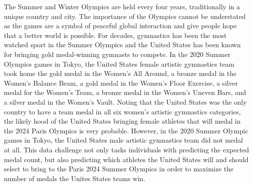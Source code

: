 \documentclass[12pt]{article}
\begin{document}
The Summer and Winter Olympics are held every four years, traditionally in a unique country and city.
The importance of the Olympics cannot be understated as the games are a symbol of peaceful global 
interaction and give people hope that a better world is possible. For decades, gymnastics  
has been the most watched sport in the Summer Olympics and the United States has been known for bringing gold 
medal-winning gymnasts to compete. In the 2020 Summer Olympics games in Tokyo, the United States 
female artistic gymnastics team took home the gold medal in the Women's All Around, a bronze medal 
in the Women's Balance Beam, a gold medal in the Women's Floor Exercise, a silver medal for the Women's
Team, a bronze medal in the Women's Uneven Bars, and a silver medal in the Women's Vault. 
Noting that the United States was the only country to have a team medal in all six women's artistic gymnastics 
categories, the likely hood of the United States bringing female athletes that will medal in the 2024 
Paris Olympics is very probable. However, in the 2020 Summer Olympic games in Tokyo, the United States 
male artistic gymnastics team did not medal at all. This data challenge not only tasks individuals 
with predicting the expected medal count, but also predicting which athletes the United States will 
and should select to bring to the Paris 2024 Summer Olympics in order to maximize the number of medals 
the Unites States teams win. \\

\\
\end{document}
